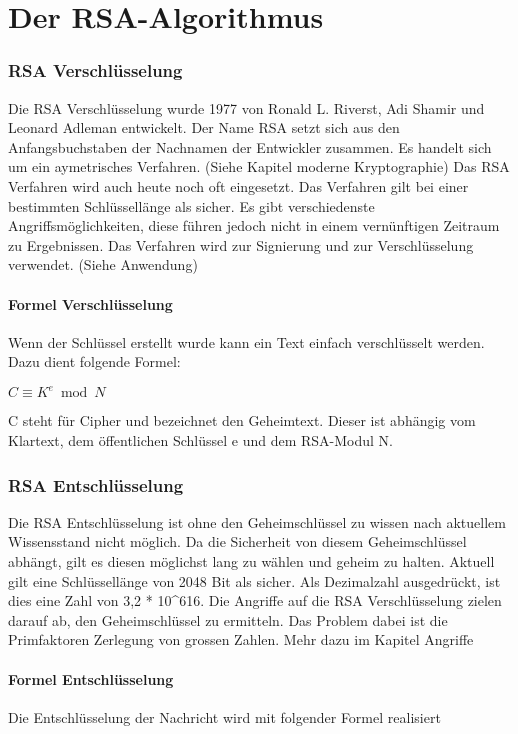 \part{Der RSA-Algorithmus}



\section{RSA Verschlüsselung}
Die RSA Verschlüsselung wurde 1977 von Ronald L. Riverst, Adi Shamir und Leonard Adleman entwickelt. Der Name RSA setzt sich aus den Anfangsbuchstaben der Nachnamen der Entwickler zusammen. Es handelt sich um ein aymetrisches Verfahren. (Siehe Kapitel moderne Kryptographie) %
Das RSA Verfahren wird auch heute noch oft eingesetzt. Das Verfahren gilt bei einer bestimmten Schlüssellänge als sicher. Es gibt verschiedenste Angriffsmöglichkeiten, diese führen jedoch nicht in einem vernünftigen Zeitraum zu Ergebnissen. Das Verfahren wird zur Signierung und zur Verschlüsselung verwendet. (Siehe Anwendung) %

\subsection{Formel Verschlüsselung}
Wenn der Schlüssel erstellt wurde kann ein Text einfach verschlüsselt werden. Dazu dient folgende Formel:

$ C \equiv K^e  \bmod N $

C steht für Cipher und bezeichnet den Geheimtext. Dieser ist abhängig vom Klartext, dem öffentlichen Schlüssel e und dem RSA-Modul N. 

\section{RSA Entschlüsselung}
Die RSA Entschlüsselung ist ohne den Geheimschlüssel zu wissen nach aktuellem Wissensstand nicht möglich. Da die Sicherheit von diesem Geheimschlüssel abhängt, gilt es diesen möglichst lang zu wählen und geheim zu halten. Aktuell gilt eine Schlüssellänge von 2048 Bit als sicher. Als Dezimalzahl ausgedrückt, ist dies eine Zahl von 3,2 * 10^616.
Die Angriffe auf die RSA Verschlüsselung zielen darauf ab, den Geheimschlüssel zu ermitteln. Das Problem dabei ist die Primfaktoren Zerlegung von grossen Zahlen. Mehr dazu im Kapitel Angriffe %

\subsection{Formel Entschlüsselung}
Die Entschlüsselung der Nachricht wird mit folgender Formel realisiert

